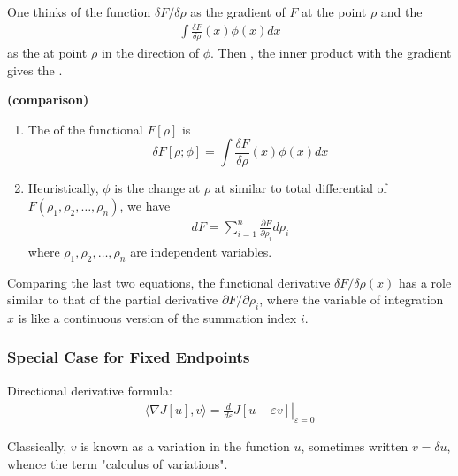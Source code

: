 \documentclass{article}
\newcommand{\bfs}[1]{\textbf{({#1}) }}
\begin{document}
One thinks of the function $\delta F / \delta \rho$ as the gradient of $F$ at the point $\rho$ and the 
\begin{align*}
\int \frac{\delta F}{\delta \rho}(x) \phi(x) d x
\end{align*}
as the  at point $\rho$ in the direction of $\phi$. Then , the inner product with the gradient gives the .
\begin{rema}\bfs{comparison}
\begin{enumerate}
    \item The  of the functional $F[\rho]$ is 
$$\delta F[\rho ; \phi]=\int \frac{\delta F}{\delta \rho}(x) \phi(x) d x$$
\item Heuristically, $\phi$ is the change at $\rho$ at similar to total differential of $F\left(\rho_{1}, \rho_{2}, \ldots, \rho_{n}\right)$, we have 
\begin{align*}
d F=\sum_{i=1}^{n} \frac{\partial F}{\partial \rho_{i}} d \rho_{i}
\end{align*}
where $\rho_{1}, \rho_{2}, \ldots, \rho_{n}$ are independent variables.
\end{enumerate}
Comparing the last two equations, the functional derivative $\delta F / \delta \rho(x)$ has a role similar to that of the partial derivative $\partial F / \partial \rho_{i}$, where the variable of integration $x$ is like a continuous version of the summation index $i$.
\end{rema}

\subsubsection{Special Case for Fixed Endpoints}
Directional derivative formula:
\begin{align}
\langle\nabla J[u], v\rangle=\left.\frac{d}{d \varepsilon} J[u+\varepsilon v]\right|_{\varepsilon=0}\label{eq:ondfvad}
\end{align}
\begin{rema}
Classically, $v$ is known as a variation in the function $u$, sometimes written $v=\delta u$, whence the term "calculus of variations".
\end{rema}
\end{document}
